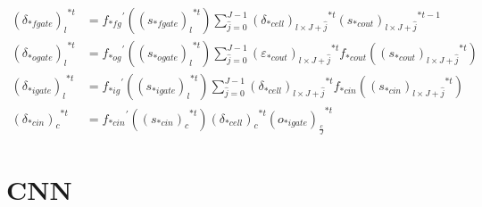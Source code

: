 \documentclass[runningheads,openany]{xhlPaper}
\begin{document}
\begin{equation}
\begin{aligned}
{\left( {{\delta _{*fgate}}} \right)_l}^{*t} &= {f_{*fg}}^{'}\left( {{{\left( {{s_{*fgate}}} \right)}_l}^{*t}} \right)\sum\limits_{\hat j = 0}^{J - 1} {{{\left( {{\delta _{*cell}}} \right)}_{l \times J + \hat j}}^{*t}{{\left( {{s_{*cout}}} \right)}_{l \times J + \hat j}}^{*t - 1}} \\
{\left( {{\delta _{*ogate}}} \right)_l}^{*t} &= {f_{*og}}^{'}\left( {{{\left( {{s_{*ogate}}} \right)}_l}^{*t}} \right)\sum\limits_{\hat j = 0}^{J - 1} {{{\left( {{\varepsilon _{*cout}}} \right)}_{l \times J + \hat j}}^{*t}{f_{*cout}}\left( {{{\left( {{s_{*cout}}} \right)}_{l \times J + \hat j}}^{*t}} \right)} \\
{\left( {{\delta _{*igate}}} \right)_l}^{*t} &= {f_{*ig}}^{'}\left( {{{\left( {{s_{*igate}}} \right)}_l}^{*t}} \right)\sum\limits_{\hat j = 0}^{J - 1} {{{\left( {{\delta _{*cell}}} \right)}_{l \times J + \hat j}}^{*t}{f_{*cin}}\left( {{{\left( {{s_{*cin}}} \right)}_{l \times J + \hat j}}^{*t}} \right)} \\
{\left( {{\delta _{*cin}}} \right)_c}^{*t} &= {f_{*cin}}^{'}\left( {{{\left( {{s_{*cin}}} \right)}_c}^{*t}} \right){\left( {{\delta _{*cell}}} \right)_c}^{*t}{\left( {{o_{*igate}}} \right)_{\frac{c}{J}}}^{*t}
\end{aligned}
\end{equation}

\section{CNN}
\end{document}
